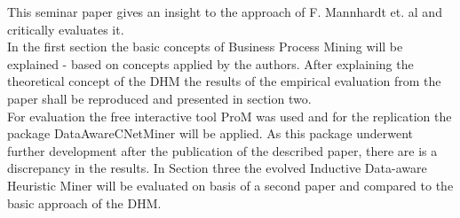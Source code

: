 This seminar paper gives an insight to the approach of F. Mannhardt et. al and critically evaluates it.\\
In the first section the basic concepts of Business Process Mining will be explained - based on concepts applied by the authors. After explaining the theoretical concept of the DHM the results of the empirical evaluation from the paper shall be reproduced and presented in section two.\\ 
For evaluation the free interactive tool \glqq{}ProM\grqq{} was used and for the replication the package \glqq DataAwareCNetMiner\grqq{} will be applied. As this package underwent further development after the publication of the described paper, there are is a discrepancy in the results. In Section three the evolved Inductive Data-aware Heuristic Miner will be evaluated on basis of a second paper and compared to the basic approach of the DHM.
